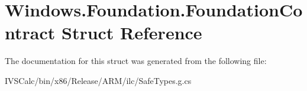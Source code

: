 \hypertarget{struct_windows_1_1_foundation_1_1_foundation_contract}{}\section{Windows.\+Foundation.\+Foundation\+Contract Struct Reference}
\label{struct_windows_1_1_foundation_1_1_foundation_contract}


The documentation for this struct was generated from the following file\+:\begin{DoxyCompactItemize}
\item 
I\+V\+S\+Calc/bin/x86/\+Release/\+A\+R\+M/ilc/Safe\+Types.\+g.\+cs\end{DoxyCompactItemize}
